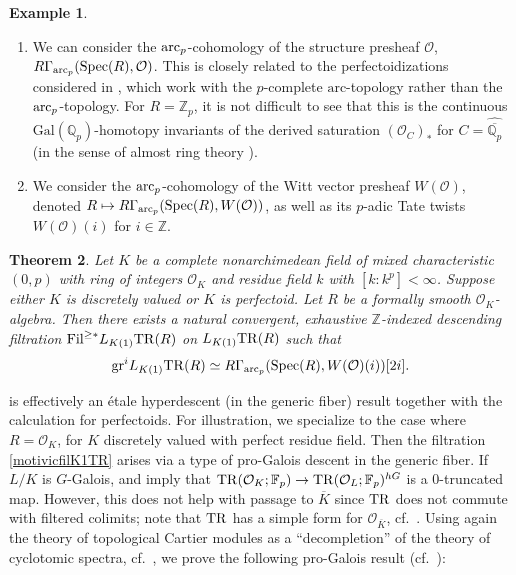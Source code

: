 \documentclass{amsart}
\newcommand{\gr}{\mathrm{gr}}
\newtheorem{theorem}{Theorem}[section]
\theoremstyle{definition}
\newcommand{\spec}{\mathrm{Spec}}
\newtheorem{example}[theorem]{Example}
\begin{document}
\begin{example} 
\begin{enumerate}
\item  
We can consider the $\mathrm{arc}_{{p}}$-cohomology of the structure presheaf $\mathcal{O}$,
$R \Gamma_{\arc}( \spec(R), \mathcal{O})$. This is closely related to the
perfectoidizations considered in \cite[Sec.~7--8]{Prisms}, which work with the
$p$-complete
$\mathrm{arc}$-topology rather than the $\mathrm{arc}_{{p}}$-topology. 
For $R = \mathbb{Z}_p$, it is not difficult to see that this is the continuous
$\mathrm{Gal}(\mathbb{Q}_p)$-homotopy invariants of the derived
saturation $(\mathcal{O}_C)_*$ for $C = \widehat{\overline{\mathbb{Q}_p}}$ (in
the sense of almost ring theory \cite{GR03}). 
\item
We consider the $\mathrm{arc}_{{p}}$-cohomology of the Witt vector presheaf $W(\mathcal{O})$, denoted 
$R \mapsto R \Gamma_{\arc}( \spec(R), W(\mathcal{O}))$, as well as its $p$-adic Tate twists
$W(\mathcal{O})(i)$ for $i \in \mathbb{Z}$. 
\end{enumerate}
\end{example} 





\begin{theorem} 
\label{sseqthmintro}
Let $K$ be a complete nonarchimedean field of  mixed characteristic $(0, p)$
with  ring of integers $\mathcal{O}_K$ and residue field $k$ with $[k: k^p] <
\infty$. 
Suppose either $K$ is discretely valued or $K$ is perfectoid. 
Let 
$R$ be a formally smooth $\mathcal{O}_K$-algebra. 
Then there exists a natural convergent, exhaustive
$\mathbb{Z}$-indexed descending filtration 
$\mathrm{Fil}^{\geq \ast} L_{K(1)} \mathrm{TR}(R) $ on $L_{K(1)}
\mathrm{TR}(R)$ such that 
\begin{equation}  \label{motivicfilK1TR} \gr^{i} L_{K(1)} \TR(R) \simeq R \Gamma_{\arc}( \spec(R),
W(\mathcal{O})(i))[2i]. \end{equation}
\end{theorem} 




 is effectively an \'etale hyperdescent (in the generic
fiber) result together with the calculation for perfectoids. 
For illustration, we specialize to the case where 
$R  = \mathcal{O}_K$, for $K$ discretely valued with perfect residue field. 
Then the filtration \eqref{motivicfilK1TR} arises via a type of pro-Galois descent in the
generic fiber. 
If $L/K$ is $G$-Galois,  and  imply that 
$\mathrm{TR}(\mathcal{O}_K; \mathbb{F}_p) \to \mathrm{TR}(\mathcal{O}_L; \mathbb{F}_p)^{hG}$ is a $0$-truncated map. 
However, this does not help with passage to $\overline{K}$ since $\mathrm{TR}$ does not
commute with filtered colimits; note that $\mathrm{TR}$ 
has a simple form for $\mathcal{O}_{\overline{K}}$, cf.~\cite{Hes06}. 
Using again the theory of topological Cartier modules as a ``decompletion'' of
the theory of cyclotomic spectra, cf.~\cite{AN},
we prove the following pro-Galois result (cf.~): 
\end{document}
